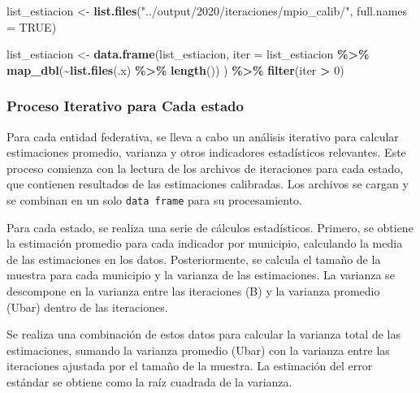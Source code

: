 \documentclass[
  12pt,
]{book}
\newenvironment{Shaded}{\begin{snugshade}}{\end{snugshade}}
\newcommand{\AttributeTok}[1]{\textcolor[rgb]{0.13,0.29,0.53}{#1}}
\newcommand{\ConstantTok}[1]{\textcolor[rgb]{0.56,0.35,0.01}{#1}}
\newcommand{\DecValTok}[1]{\textcolor[rgb]{0.00,0.00,0.81}{#1}}
\newcommand{\FunctionTok}[1]{\textcolor[rgb]{0.13,0.29,0.53}{\textbf{#1}}}
\newcommand{\NormalTok}[1]{#1}
\newcommand{\OtherTok}[1]{\textcolor[rgb]{0.56,0.35,0.01}{#1}}
\newcommand{\SpecialCharTok}[1]{\textcolor[rgb]{0.81,0.36,0.00}{\textbf{#1}}}
\newcommand{\StringTok}[1]{\textcolor[rgb]{0.31,0.60,0.02}{#1}}
\begin{document}
\begin{Shaded}
\begin{Highlighting}[]
\NormalTok{list\_estiacion }\OtherTok{\textless{}{-}} \FunctionTok{list.files}\NormalTok{(}\StringTok{"../output/2020/iteraciones/mpio\_calib/"}\NormalTok{, }\AttributeTok{full.names =} \ConstantTok{TRUE}\NormalTok{)}

\NormalTok{list\_estiacion }\OtherTok{\textless{}{-}} \FunctionTok{data.frame}\NormalTok{(list\_estiacion,}
\AttributeTok{iter =}\NormalTok{ list\_estiacion }\SpecialCharTok{\%\textgreater{}\%} \FunctionTok{map\_dbl}\NormalTok{(}\SpecialCharTok{\textasciitilde{}}\FunctionTok{list.files}\NormalTok{(.x) }\SpecialCharTok{\%\textgreater{}\%} \FunctionTok{length}\NormalTok{())}
\NormalTok{) }\SpecialCharTok{\%\textgreater{}\%} \FunctionTok{filter}\NormalTok{(iter }\SpecialCharTok{\textgreater{}} \DecValTok{0}\NormalTok{)}
\end{Highlighting}
\end{Shaded}

\hypertarget{proceso-iterativo-para-cada-estado}{%
\subsubsection*{Proceso Iterativo para Cada estado}\label{proceso-iterativo-para-cada-estado}}

Para cada entidad federativa, se lleva a cabo un análisis iterativo para calcular estimaciones promedio, varianza y otros indicadores estadísticos relevantes. Este proceso comienza con la lectura de los archivos de iteraciones para cada estado, que contienen resultados de las estimaciones calibradas. Los archivos se cargan y se combinan en un solo \texttt{data\ frame} para su procesamiento.

Para cada estado, se realiza una serie de cálculos estadísticos. Primero, se obtiene la estimación promedio para cada indicador por municipio, calculando la media de las estimaciones en los datos. Posteriormente, se calcula el tamaño de la muestra para cada municipio y la varianza de las estimaciones. La varianza se descompone en la varianza entre las iteraciones (B) y la varianza promedio (Ubar) dentro de las iteraciones.

Se realiza una combinación de estos datos para calcular la varianza total de las estimaciones, sumando la varianza promedio (Ubar) con la varianza entre las iteraciones ajustada por el tamaño de la muestra. La estimación del error estándar se obtiene como la raíz cuadrada de la varianza.
\end{document}
